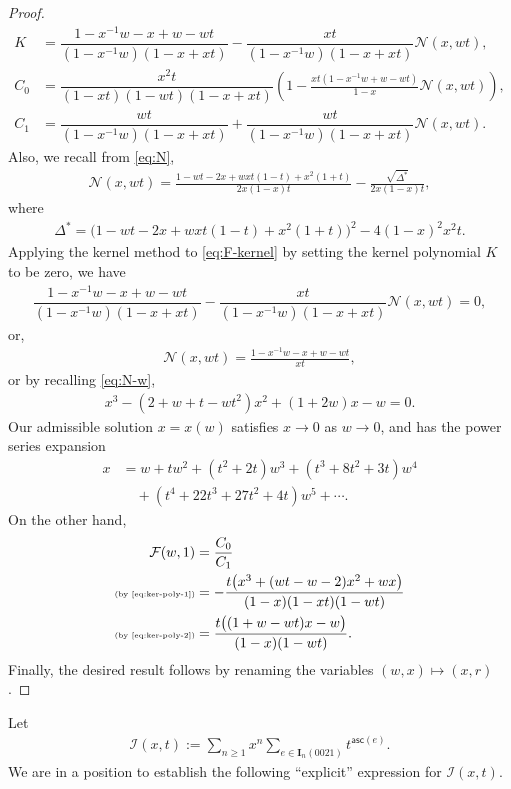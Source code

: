 \documentclass[reqno]{amsart}
\numberwithin{equation}{section}
\theoremstyle{plain}
\theoremstyle{definition}
\theoremstyle{named}
\newcommand{\bI}{\mathbf{I}}
\newcommand{\asc}{\mathsf{asc}}
\newcommand{\cN}{\mathcal{N}}
\newcommand{\cF}{\mathcal{F}}
\newcommand{\cI}{\mathcal{I}}
\begin{document}
\begin{proof}
	\begin{align*}
		K&=\dfrac{1-x^{-1}w-x+w-wt}{(1-x^{-1}w)(1-x+xt)}-\dfrac{xt}{(1-x^{-1}w)(1-x+xt)}\cN(x,wt),\\
		C_0&=\dfrac{x^2t}{(1-xt)(1-wt)(1-x+xt)}\left(1-\frac{xt(1-x^{-1}w+w-wt)}{1-x}\cN(x,wt)\right),\\
		C_1&=\dfrac{wt}{(1-x^{-1}w)(1-x+xt)}+\dfrac{wt}{(1-x^{-1}w)(1-x+xt)}\cN(x,wt).
	\end{align*}
	Also, we recall from \eqref{eq:N},
	\begin{align}\label{eq:N-w}
		\cN(x,wt)=\frac{1-wt-2x+wxt(1-t)+x^2(1+t)}{2x(1-x)t}-\frac{\sqrt{\Delta^*}}{2x(1-x)t},
	\end{align}
	where
	\begin{align*}
		\Delta^*=\big(1-wt-2x+wxt(1-t)+x^2(1+t)\big)^2-4(1-x)^2 x^2 t.
	\end{align*}
	Applying the kernel method to \eqref{eq:F-kernel} by setting the kernel polynomial $K$ to be zero, we have
	\begin{align*}
		\dfrac{1-x^{-1}w-x+w-wt}{(1-x^{-1}w)(1-x+xt)}-\dfrac{xt}{(1-x^{-1}w)(1-x+xt)}\cN(x,wt)=0,
	\end{align*}
	or,
	\begin{align}\label{eq:ker-poly-1}
		\cN(x,wt) = \frac{1-x^{-1}w-x+w-wt}{xt},
	\end{align}
	or by recalling \eqref{eq:N-w},
	\begin{align}\label{eq:ker-poly-2}
		x^3-(2+w+t-wt^2)x^2+(1+2w)x-w=0.
	\end{align}
	Our admissible solution $x=x(w)$ satisfies $x\to 0$ as $w\to 0$, and has the power series expansion
	\begin{align*}
		x&=w + t w^2 + (t ^2+2 t) w^3 + (t ^3+8 t ^2+3 t) w^4\\
		&\quad + (t ^4+22 t ^3+27 t ^2+4 t) w^5+\cdots.
	\end{align*}
	On the other hand,
	\begin{align*}
		\cF(w,1)&=\frac{C_0}{C_1}\\
		\text{\tiny (by \eqref{eq:ker-poly-1})}&=-\frac{t \big(x^3+(wt-w-2)x^2+w x\big)}{(1-x)(1-xt)(1-wt)}\\
		\text{\tiny (by \eqref{eq:ker-poly-2})} &= \frac{t\big((1+w-wt) x-w\big)}{(1-x)(1-wt)}.
	\end{align*}
	Finally, the desired result follows by renaming the variables $(w,x)\mapsto (x,r)$.
\end{proof}

Let
\begin{align}
	\cI(x,t):=\sum_{n\ge 1}x^n\sum_{e\in\bI_n(0021)}t^{\asc(e)}.
\end{align}
We are in a position to establish the following ``explicit'' expression for $\cI(x,t)$.
\end{document}
